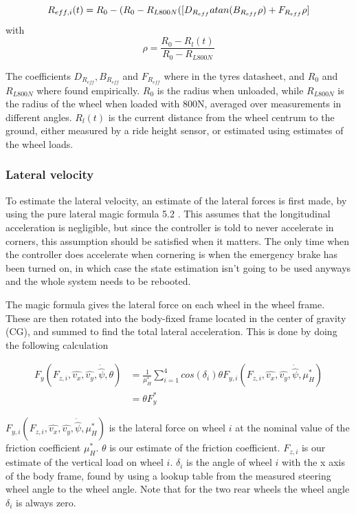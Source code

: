 \begin{equation}
    R_{eff,i}(t) = R_0 - (R_0-R_{L800N}([D_{R_{eff}}atan(B_{R_{eff}}\rho) + \\ F_{R_{eff}}\rho]
\end{equation}
with
\begin{equation}
    \rho = \frac{R_0-R_l(t)}{R_0-R_{L800N}}
\end{equation}

The coefficients $D_{R_{eff}}, B_{R_{eff}}$ and $F_{R_{eff}}$ where in the tyres datasheet, and $R_0$ and $R_{L800N}$ where found empirically. $R_0$ is the radius when unloaded, while $R_{L800N}$ is the radius of the wheel when loaded with 800N, averaged over measurements in different angles. $R_l(t)$ is the current distance from the wheel centrum to the ground, either measured by a ride height sensor, or estimated using estimates of the wheel loads.

\subsubsection{Lateral velocity} 
To estimate the lateral velocity, an estimate of the lateral forces is first made, by using the pure lateral magic formula 5.2 \cite{MagicFormula5_2}. This assumes that the longitudinal acceleration is negligible, but since the controller is told to never accelerate in corners, this assumption should be satisfied when it matters. The only time when the controller does accelerate when cornering is when the emergency brake has been turned on, in which case the state estimation isn't going to be used anyways and the whole system needs to be rebooted. 

The magic formula gives the lateral force on each wheel in the wheel frame. These are then rotated into the body-fixed frame located in the center of gravity (CG), and summed to find the total lateral acceleration. This is done by doing the following calculation

\begin{align}
    F_y(F_{z,i},\hat{v_x},\hat{v_y},\dot{\hat{\psi}}, \theta) & = \frac{1}{\mu_{H}^{*}}\sum_{i=1}^{4}cos(\delta_i)\theta F_{y,i}(F_{z,i},\hat{v_x},\hat{v_y},\dot{\hat{\psi}}, \mu_{H}^{*}) \\
    & =  \theta F_y^{*}
\end{align}

$F_{y,i}(F_{z,i},\hat{v_x},\hat{v_y},\dot{\hat{\psi}}, \mu_{H}^{*})$ is the lateral force on wheel $i$ at the nominal value of the friction coefficient $\mu_{H}^{*}$. $\theta$ is our estimate of the friction coefficient. $F_{z,i}$ is our estimate of the vertical load on wheel $i$. $\delta_i$ is the angle of wheel $i$ with the x axis of the body frame, found by using a lookup table from the measured steering wheel angle to the wheel angle. Note that for the two rear wheels the wheel angle $\delta_i$ is always zero. 

